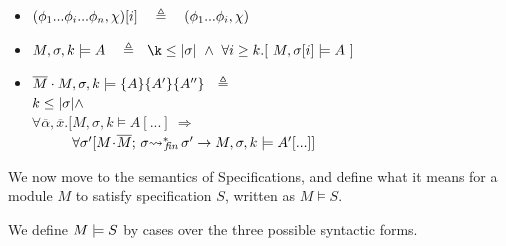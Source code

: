 {{\begin{definition}
\begin{itemize}
\item
 $\RestictTo {(\phi_1...\phi_i...\phi_n,\chi)} {i}\ \ \ \triangleq \ \ \ (\phi_1...\phi_i,\chi)$
\item
$  M, \sigma, k \models  A  \ \  \ \triangleq \ \ \k\leq  \DepthSt {\sigma} \ \wedge \  \forall i\geq k.[\ M,{\RestictTo {\sigma}{i}} \models A \ ]$ 
\item
$\overline{M}\cdot M, \sigma, k \models \{ A \}\{ A' \} \{ A'' \}  \ \ \triangleq \ \ $ 
\\
$k \leq  |\sigma| \wedge$\\
$  \forall \overline{\alpha}, \overline{x} .[     M, \sigma, k \models A[...]\ \Longrightarrow$\\
$\strut \hspace{1cm} \forall \sigma'  [ {M\!\cdot\! \overline{M};\, {\sigma} {\rightsquigarrow^*}\!\!_{\mathit{fin}}\, \sigma' }  \rightarrow     M, \sigma, k \models A'[...] ] $
\end{itemize}
\end{definition}
  
We now move to the semantics of \SpecLang Specifications, and   define what it means for  a module  $M$ to satisfy specification  $S$, written as $M \vDash S$.  
 
\begin{definition}%

We define $M \models {S}$ by cases over the three possible syntactic forms.

\label{def:necessity-semantics}


\end{definition}}}
